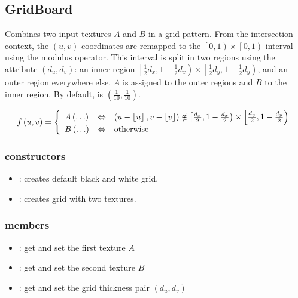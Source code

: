 \subsection{GridBoard}

Combines two input textures $A$ and $B$ in a grid pattern.  From the intersection context, the $\left(u, v\right)$ coordinates are remapped to the $\left[0, 1\right) \times \left[0, 1\right)$ interval using the modulus operator.  This interval is split in two regions using the  attribute $\left(d_u, d_v\right)$: an inner region $\left[\frac 1 2 d_x , 1-\frac 1 2 d_x\right) \times \left[\frac 1 2 d_y, 1-\frac 1 2 d_y\right)$, and an outer region everywhere else.  $A$ is assigned to the outer regions and $B$ to the inner region.  By default,  is $\left(\frac 1 {10}, \frac 1 {10}\right)$.

\begin{equation}
	f\left(u, v\right) = \left\{
		\begin{array}{lcl}
			A\left(\ldots\right) & \Leftrightarrow &
				\left(u - \left\lfloor u \right\rfloor, v - \left\lfloor v \right\rfloor\right) \notin
				\left[\frac {d_x} 2, 1-\frac {d_x} 2\right) \times
				\left[\frac {d_y} 2, 1-\frac {d_y} 2\right)\\
			B\left(\ldots\right) & \Leftrightarrow & \textnormal{otherwise}
		\end{array}
	\right.
\end{equation}

\subsubsection*{constructors}
\begin{itemize}
	\item {}:
		creates default black and white grid.
	\item {}:
		creates grid with two textures.
\end{itemize}

\subsubsection*{members}
\begin{itemize}
	\item {}:
		get and set the first texture $A$
	\item {}:
		get and set the second texture $B$
	\item {}:
		get and set the grid thickness pair $\left(d_u, d_v\right)$
\end{itemize}



